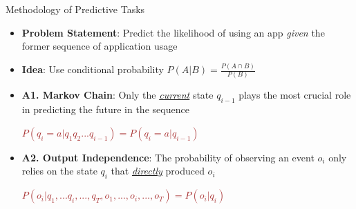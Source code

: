 \documentclass[final]{beamer}
\newlength{\colwidth}
\begin{document}
\begin{frame}[t]
\begin{columns}[t]
\begin{column}{\colwidth}
\begin{exampleblock}{\huge{Methodology of Predictive Tasks}}
        {
          \fontsize{37pt}{44.4pt} \selectfont {}

          \begin{itemize}
            \item \textbf{Problem Statement}: Predict the likelihood of using an app \textit{given} the former sequence of application usage
            \item \textbf{Idea}: Use conditional probability $P(A|B) = \frac{P(A\cap B)}{P(B)}$

            \item \textbf{A1. Markov Chain}: Only the \underline{\textit{current}} state $q_{i-1}$ plays the most crucial role in predicting the future in the sequence \\
                  {\centering \textcolor{brown}{$P(q_i = a | q_1q_2...q_{i-1}) = P(q_i= a | q_{i-1})$} \par}

            \item \textbf{A2. Output Independence}: The probability of observing an event $o_i$ only relies on the state $q_i$ that \underline{\textit{directly}} produced $o_i$
\\
                    {\centering \textcolor{brown}{$P(o_i | q_1, ... q_i , ..., q_T, o_1, ..., o_i, ..., o_T) = P(o_i | q_i)$} \par}
                    

\end{itemize}}
\end{exampleblock}
\end{column}
\end{columns}
\end{frame}
\end{document}
